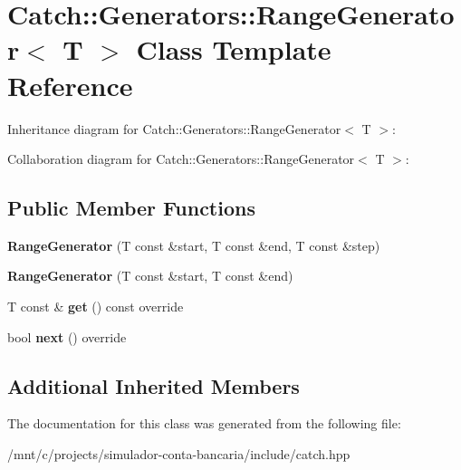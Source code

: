 \hypertarget{classCatch_1_1Generators_1_1RangeGenerator}{}\section{Catch\+:\+:Generators\+:\+:Range\+Generator$<$ T $>$ Class Template Reference}
\label{classCatch_1_1Generators_1_1RangeGenerator}


Inheritance diagram for Catch\+:\+:Generators\+:\+:Range\+Generator$<$ T $>$\+:


Collaboration diagram for Catch\+:\+:Generators\+:\+:Range\+Generator$<$ T $>$\+:
\subsection*{Public Member Functions}
\begin{DoxyCompactItemize}
\item 
\mbox{\label{classCatch_1_1Generators_1_1RangeGenerator_a6a9b3cc009471c085c985642e0ab102e}} 
{\bfseries Range\+Generator} (T const \&start, T const \&end, T const \&step)
\item 
\mbox{\label{classCatch_1_1Generators_1_1RangeGenerator_ac999eb143945ff311b97d2c767df90d3}} 
{\bfseries Range\+Generator} (T const \&start, T const \&end)
\item 
\mbox{\label{classCatch_1_1Generators_1_1RangeGenerator_a2639173bb9f06ba353314cd226fcefec}} 
T const  \& {\bfseries get} () const override
\item 
\mbox{\label{classCatch_1_1Generators_1_1RangeGenerator_a4e6b2038832f09724d5a4355b4691259}} 
bool {\bfseries next} () override
\end{DoxyCompactItemize}
\subsection*{Additional Inherited Members}


The documentation for this class was generated from the following file\+:\begin{DoxyCompactItemize}
\item 
/mnt/c/projects/simulador-\/conta-\/bancaria/include/catch.\+hpp\end{DoxyCompactItemize}
